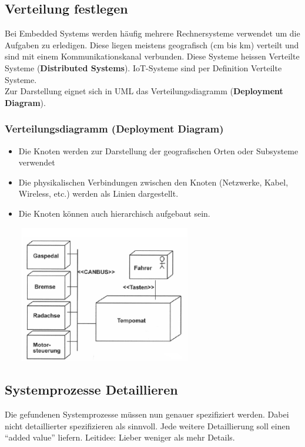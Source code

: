 \subsection{Verteilung festlegen}
Bei Embedded Systems werden häufig mehrere Rechnersysteme verwendet um die Aufgaben zu erledigen. Diese liegen meistens geografisch (cm bis km) verteilt und sind mit einem Kommunikationskanal verbunden. Diese Systeme heissen Verteilte Systeme (\textbf{Distributed Systems}). IoT-Systeme sind per Definition Verteilte Systeme.\\
Zur Darstellung eignet sich in UML das Verteilungsdiagramm (\textbf{Deployment Diagram}).

\subsubsection{Verteilungsdiagramm (Deployment Diagram)}
\begin{multicols}{2}
\begin{itemize}
	\item Die Knoten werden zur Darstellung der geografischen Orten oder Subsysteme verwendet
	\item Die physikalischen Verbindungen zwischen den Knoten (Netzwerke, Kabel, Wireless, etc.) werden als Linien dargestellt.
	\item Die Knoten können auch hierarchisch aufgebaut sein.
\end{itemize}
\vfill\null
\columnbreak
\includegraphics[height=6cm, width = 9cm,]{images/Modellierung/Verteilungsdiagramm}
\end{multicols}

\subsection{Systemprozesse Detaillieren}
Die gefundenen Systemprozesse müssen nun genauer spezifiziert werden. Dabei nicht detaillierter spezifizieren als sinnvoll. Jede weitere Detaillierung soll einen "`added value"' liefern.
Leitidee: Lieber weniger als mehr Details.

